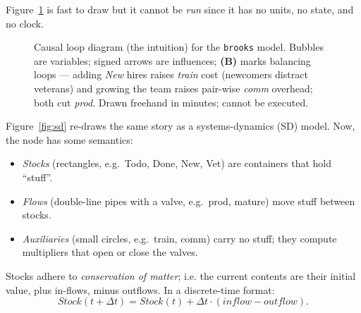 \documentclass[10pt,conference]{IEEEtran}
\begin{document}
Figure~\ref{fig:cld} is fast to draw but it
cannot be \emph{run} since it  has no units, no
  state, and no clock.
\begin{figure}[t]
\centering
{}
\caption{Causal loop diagram (the intuition) for the \texttt{brooks}
model. Bubbles are variables; signed arrows are influences;
\textbf{(B)} marks balancing loops --- adding \emph{New} hires
raises \emph{train} cost (newcomers distract veterans) and growing
the team raises pair-wise \emph{comm} overhead; both cut \emph{prod}.
Drawn freehand in minutes; cannot be executed.}
\label{fig:cld}
\end{figure}
Figure~\ref{fig:sd} re-draws the same
story as a systems-dynamics (SD) model. Now, the node has some semantics:
\begin{itemize}\itemsep0pt
  \item \emph{Stocks} (rectangles, e.g.\ \textsf{Todo},
        \textsf{Done}, \textsf{New}, \textsf{Vet}) are containers that hold
        ``stuff''.
  \item \emph{Flows} (double-line pipes with a valve, e.g.\
        \textsf{prod}, \textsf{mature}) move stuff between stocks.
  \item \emph{Auxiliaries} (small circles, e.g.\ \textsf{train},
        \textsf{comm}) carry no stuff; they compute multipliers
        that open or close the valves.
\end{itemize}
Stocks adhere to \emph{conservation of matter}; i.e. the current contents
are their initial value, plus in-flows, minus outflows.
In a discrete-time format:
\begin{equation}\label{eq:stock}
\mathit{Stock}(t+\Delta t) = \mathit{Stock}(t) + \Delta t \cdot (\mathit{inflow} - \mathit{outflow}).
\end{equation}
\end{document}
